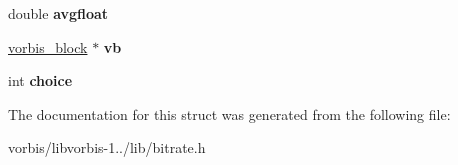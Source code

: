 \begin{DoxyCompactItemize}
\item 
\hypertarget{structbitrate__manager__state_a97494b734f47a814b535cd8f07203a03}{double {\bfseries avgfloat}}\label{structbitrate__manager__state_a97494b734f47a814b535cd8f07203a03}

\item 
\hypertarget{structbitrate__manager__state_a79de5ce8aa30385d2b9d1c0639ef9c68}{\hyperlink{structvorbis__block}{vorbis\+\_\+block} $\ast$ {\bfseries vb}}\label{structbitrate__manager__state_a79de5ce8aa30385d2b9d1c0639ef9c68}

\item 
\hypertarget{structbitrate__manager__state_a705c9b3e162719911c04ab57e09d4149}{int {\bfseries choice}}\label{structbitrate__manager__state_a705c9b3e162719911c04ab57e09d4149}

\end{DoxyCompactItemize}


The documentation for this struct was generated from the following file\+:\begin{DoxyCompactItemize}
\item 
vorbis/libvorbis-\/1../lib/bitrate.\+h\end{DoxyCompactItemize}
